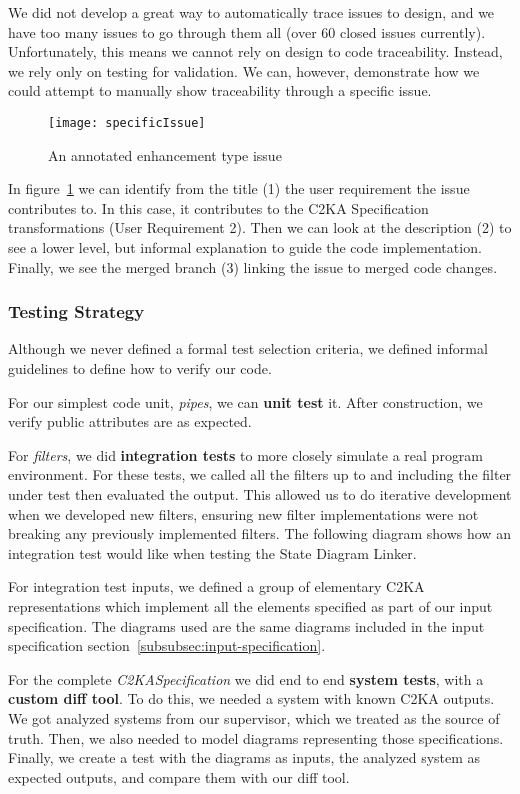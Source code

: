 We did not develop a great way to automatically trace issues to design,
and we have too many issues to go through them all (over 60 closed issues currently).
Unfortunately, this means we cannot rely on design to code traceability.
Instead, we rely only on testing for validation.
We can, however, demonstrate how we could attempt to manually show traceability through a specific issue.
\begin{figure}[h]
    \centering
    \texttt{[image: specificIssue]}
    \caption{An annotated enhancement type issue}
    \label{fig:specificIssue}
\end{figure}
In figure~\ref{fig:specificIssue} we can identify from the title (1) the user requirement the issue contributes to.
In this case, it contributes to the C2KA Specification transformations (User Requirement 2).
Then we can look at the description (2) to see a lower level, but informal explanation to guide the code implementation.
Finally, we see the merged branch (3) linking the issue to merged code changes.

\newpage
\subsubsection{Testing Strategy}\label{subsubsec:tests-strat}
Although we never defined a formal test selection criteria,
we defined informal guidelines to define how to verify our code.

For our simplest code unit, \textit{pipes}, we can \textbf{unit test} it.
After construction, we verify public attributes are as expected.

For \textit{filters}, we did \textbf{integration tests} to more closely simulate a real program environment.
For these tests, we called all the filters up to and including the filter under test then evaluated the output.
This allowed us to do iterative development when we developed new filters,
ensuring new filter implementations were not breaking any previously implemented filters.
The following diagram shows how an integration test would like when testing the State Diagram Linker.

For integration test inputs, we defined a group of elementary C2KA representations which implement
all the elements specified as part of our input specification.
The diagrams used are the same diagrams included in the input specification section~\ref{subsubsec:input-specification}.

For the complete \textit{C2KASpecification} we did end to end \textbf{system tests}, with a \textbf{custom diff tool}.
To do this, we needed a system with known C2KA outputs.
We got analyzed systems from our supervisor, which we treated as the source of truth.
Then, we also needed to model diagrams representing those specifications.
Finally, we create a test with the diagrams as inputs, the analyzed system as expected outputs,
and compare them with our diff tool.


